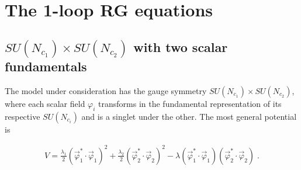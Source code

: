 \section{\label{eqs} The 1-loop RG equations}
\subsection{\label{SUNc12} $SU(N_{c_1}) \times SU(N_{c_2})$  with two scalar fundamentals}

The model under consideration has the gauge symmetry $SU(N_{c_1}) \times SU(N_{c_2})$, 
where each scalar field $\varphi_i$ transforms in the fundamental 
representation of its respective $SU(N_{c_i})$ and is a singlet under the other. 
The most general potential is

\begin{align}
V=\frac{\lambda_1}{2}\left(\vec{\varphi}_1^*\cdot\vec{\varphi}_1\right)^2+\frac{\lambda_2}{2}\left(\vec{\varphi}_2^*\cdot\vec{\varphi}_2\right)^2-
\lambda\left(\vec{\varphi}_1^*\cdot\vec{\varphi}_1\right)\left(\vec{\varphi}_2^*\cdot\vec{\varphi}_2\right)\;.\label{eq:pot}
\end{align}

